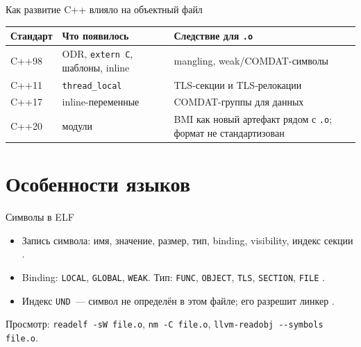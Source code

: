 \documentclass[aspectratio=169,11pt]{beamer}
\newcommand{\externC}{\texttt{extern~\textquotedbl C\textquotedbl}}
\begin{document}
\begin{frame}{Как развитие C++ влияло на объектный файл}
  \small
  \begin{center}
    \begin{tabularx}{0.96\textwidth}{lYY}
      \toprule
      Стандарт & Что появилось                                & Следствие для \texttt{.o}                                                        \\
      \midrule
      C++98    & ODR, \externC, шаблоны, inline \cite{cppref} & mangling, weak/COMDAT-символы \cite{itanium}                                     \\
      C++11    & \texttt{thread\_local}                       & TLS-секции и TLS-релокации \cite{drepperTLS}                                     \\
      C++17    & inline-переменные \cite{cppref}              & COMDAT-группы для данных \cite{itanium}                                          \\
      C++20    & модули \cite{cppref}                         & BMI как новый артефакт рядом с \texttt{.o}; формат не стандартизован \cite{cppref} \\
      \bottomrule
    \end{tabularx}
  \end{center}
\end{frame}

\section{Особенности языков}

\begin{frame}{Символы в ELF}
  \begin{itemize}
    \item Запись символа: имя, значение, размер, тип, binding, visibility, индекс секции \cite{tis}.
    \item Binding: \texttt{LOCAL}, \texttt{GLOBAL}, \texttt{WEAK}. Тип: \texttt{FUNC}, \texttt{OBJECT}, \texttt{TLS}, \texttt{SECTION}, \texttt{FILE} \cite{tis}.
    \item Индекс \texttt{UND}~--- символ не определён в этом файле; его разрешит линкер \cite{tis}.
  \end{itemize}
  \medskip
  Просмотр: \texttt{readelf -sW file.o}, \texttt{nm -C file.o}, \texttt{llvm-readobj -{}-symbols file.o}.
\end{frame}
\end{document}
